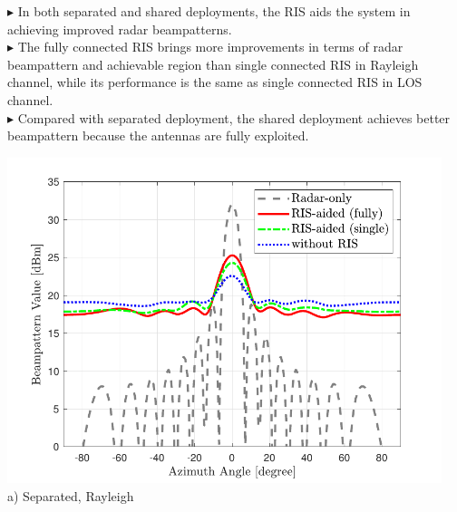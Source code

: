 \documentclass[paperwidth=841mm,paperheight=1300mm,portrait]{baposter}
\begin{document}
\begin{poster}
{    \begin{minipage}[c]{0.26\textwidth}
        $\blacktriangleright$ In both separated and shared deployments, the RIS aids the system in achieving
        improved radar beampatterns.
        \vspace{5pt}\\
        $\blacktriangleright$ The fully connected RIS brings more improvements in terms of radar beampattern
        and achievable region than single connected RIS in Rayleigh channel,
        while its performance is the same as single connected RIS in LOS channel.
        \vspace{5pt}\\
        $\blacktriangleright$ Compared with separated deployment, the shared deployment achieves better beampattern because the antennas are fully exploited.
    \end{minipage}
    \begin{minipage}[c]{0.37\textwidth}
        \vspace{10pt}
        \begin{minipage}[c]{\textwidth}
            \centering
            \includegraphics[width=0.95\textwidth]{fig/beampattern_rayleigh_single_fully_b}\vspace{2pt}\\
            \small{a) Separated, Rayleigh}
        \end{minipage}\vspace{10pt}\\
        \begin{minipage}[c]{\textwidth}
            \centering

\end{minipage}
\end{minipage}}
\end{poster}
\end{document}
